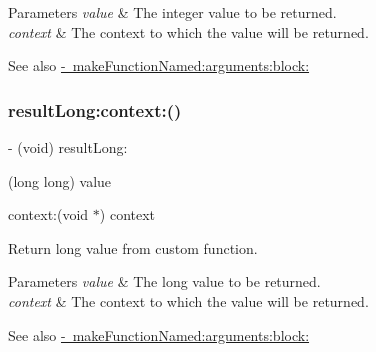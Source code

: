 \begin{DoxyParams}{Parameters}
{\em value} & The integer value to be returned. \\
\hline
{\em context} & The context to which the value will be returned.\\
\hline
\end{DoxyParams}
\begin{DoxySeeAlso}{See also}
\mbox{\hyperlink{interface_o_p_t_l_y_f_m_d_b_database_af2c3e10041c8d0a95e2feb84a2ffa645}{-\/ make\+Function\+Named\+:arguments\+:block\+:}} 
\end{DoxySeeAlso}
\mbox{\label{interface_o_p_t_l_y_f_m_d_b_database_ac26186953f5c9ce369dce9dd94356be2}} 
\subsubsection{\texorpdfstring{result\+Long\+:context\+:()}{resultLong:context:()}}
{\footnotesize\ttfamily -\/ (void) result\+Long\+: \begin{DoxyParamCaption}\item[{(long long)}]{value }\item[{context:(void $\ast$)}]{context }\end{DoxyParamCaption}}

Return long value from custom function.


\begin{DoxyParams}{Parameters}
{\em value} & The long value to be returned. \\
\hline
{\em context} & The context to which the value will be returned.\\
\hline
\end{DoxyParams}
\begin{DoxySeeAlso}{See also}
\mbox{\hyperlink{interface_o_p_t_l_y_f_m_d_b_database_af2c3e10041c8d0a95e2feb84a2ffa645}{-\/ make\+Function\+Named\+:arguments\+:block\+:}} 
\end{DoxySeeAlso}
\mbox{\label{interface_o_p_t_l_y_f_m_d_b_database_aba9df34d2c12d9e68c205e3ae2234400}} 
